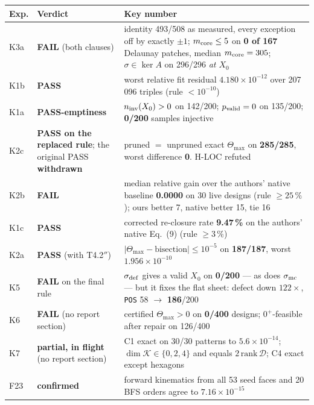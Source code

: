 \documentclass[10pt,a4paper]{article}
\begin{document}
\begin{table}[h]\centering\small
\begin{tabular}{@{}p{9mm}p{30mm}p{115mm}@{}}
\toprule
Exp. & Verdict & Key number \\
\midrule
K3a & \textbf{FAIL} (both clauses) & identity 493/508 as measured, every exception off by exactly $\pm1$; $m_{\rm core}\le5$ on \textbf{0 of 167} Delaunay patches, median $m_{\rm core} = 305$; $\sigma\in\ker A$ on 296/296 \emph{at $X_0$} \\
K1b & \textbf{PASS} & worst relative fit residual $4.180\times10^{-12}$ over 207\,096 triples (rule $<10^{-10}$) \\
K1a & \textbf{PASS-emptiness} & $n_{\rm inv}(X_0)>0$ on 142/200; $p_{\rm valid}=0$ on 135/200; \textbf{0/200} samples injective \\
K2c & \textbf{PASS on the replaced rule}; the original PASS \textbf{withdrawn} & pruned $=$ unpruned exact $\Theta_{\max}$ on \textbf{285/285}, worst difference \textbf{0}. H-LOC refuted \\
K2b & \textbf{FAIL} & median relative gain over the authors' native baseline \textbf{0.0000} on 30 live designs (rule $\ge25\,\%$); ours better 7, native better 15, tie 16 \\
K1c & \textbf{PASS} & corrected re-closure rate \textbf{9.47\,\%} on the authors' native Eq.~(9) (rule $\ge3\,\%$) \\
K2a & \textbf{PASS} (with T4.2$''$) & $|\Theta_{\max} - \text{bisection}| \le 10^{-5}$ on \textbf{187/187}, worst $1.956\times10^{-10}$ \\
K5 & \textbf{FAIL} on the final rule & $\sigma_{\rm def}$ gives a valid $X_0$ on \textbf{0/200} --- as does $\sigma_{\rm mc}$ --- but it fixes the flat sheet: defect down $122\times$, \texttt{POS} 58 $\to$ \textbf{186}/200 \\
K6 & \textbf{FAIL} (no report section) & certified $\Theta_{\max}>0$ on \textbf{0/400} designs; $0^+$-feasible after repair on 126/400 \\
K7 & \textbf{partial, in flight} (no report section) & C1 exact on 30/30 patterns to $5.6\times10^{-14}$; $\dim\mathcal K \in\{0,2,4\}$ and equals $2\,\mathrm{rank}\,\mathcal D$; C4 exact except hexagons \\
F23 & \textbf{confirmed} & forward kinematics from all 53 seed faces and 20 BFS orders agree to $7.16\times10^{-15}$ \\
\bottomrule
\end{tabular}
\end{table}
\end{document}
